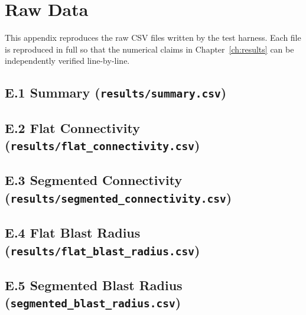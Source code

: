 \chapter{Raw Data}
\label{ch:appendix-data}

This appendix reproduces the raw CSV files written by the test harness. Each file is reproduced in full so that the numerical claims in Chapter~\ref{ch:results} can be independently verified line-by-line.

\section*{E.1 \quad Summary (\texttt{results/summary.csv})}


\section*{E.2 \quad Flat Connectivity (\texttt{results/flat\_connectivity.csv})}


\section*{E.3 \quad Segmented Connectivity (\texttt{results/segmented\_connectivity.csv})}


\section*{E.4 \quad Flat Blast Radius (\texttt{results/flat\_blast\_radius.csv})}


\section*{E.5 \quad Segmented Blast Radius (\texttt{segmented\_blast\_radius.csv})}


